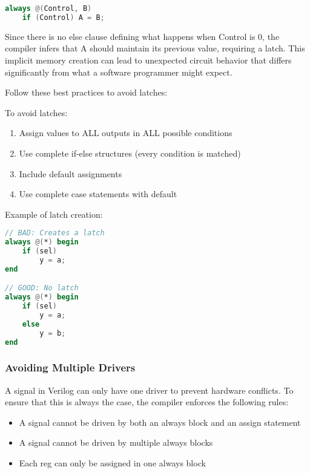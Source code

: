\documentclass[12pt]{labmanual}
\begin{document}
\begin{lstlisting}[language=verilog]
always @(Control, B)
    if (Control) A = B;
\end{lstlisting}
Since there is no else clause defining what happens when Control is 0, the compiler infers that A should maintain its previous value, requiring a latch. This implicit memory creation can lead to unexpected circuit behavior that differs significantly from what a software programmer might expect.

Follow these best practices to avoid latches:
\begin{important}
To avoid latches:
\begin{enumerate}
    \item Assign values to ALL outputs in ALL possible conditions
    \item Use complete if-else structures (every condition is matched)
    \item Include default assignments
    \item Use complete case statements with default
\end{enumerate}
\end{important}

Example of latch creation:
\begin{lstlisting}[language=verilog]
// BAD: Creates a latch
always @(*) begin
    if (sel) 
        y = a;
end

// GOOD: No latch
always @(*) begin
    if (sel)
        y = a;
    else
        y = b;
end
\end{lstlisting}

\subsubsection{Avoiding Multiple Drivers}

A signal in Verilog can only have one driver to prevent hardware conflicts. To ensure that this is always the case, the compiler enforces the following rules:

\begin{important}
\begin{itemize}
    \item A signal cannot be driven by both an always block and an assign statement
    \item A signal cannot be driven by multiple always blocks
    \item Each reg can only be assigned in one always block
\end{itemize}
\end{important}
\end{document}
